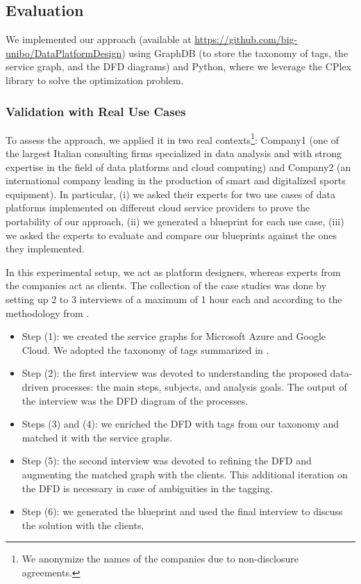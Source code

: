 \subsection{Evaluation}
\label{sec:pdd-eval}

We implemented our approach (available at \url{https://github.com/big-unibo/DataPlatformDesign}) using GraphDB (to store the taxonomy of tags, the service graph, and the DFD diagrams) and Python, where we leverage the CPlex library to solve the optimization problem.

\subsubsection{Validation with Real Use Cases}
\label{sec:pdd-val}

To assess the approach, we applied it in two real contexts\footnote{We anonymize the names of the companies due to non-disclosure agreements.}: Company1 (one of the largest Italian consulting firms specialized in data analysis and with strong expertise in the field of data platforms and cloud computing) and Company2 (an international company leading in the production of smart and digitalized sports equipment). In particular, (i) we asked their experts for two use cases of data platforms implemented on different cloud service providers to prove the portability of our approach, (ii) we generated a blueprint for each use case, (iii) we asked the experts to evaluate and compare our blueprints against the ones they implemented.

In this experimental setup, we act as platform designers, whereas experts from the companies act as clients. The collection of the case studies was done by setting up 2 to 3 interviews of a maximum of 1 hour each and according to the methodology from .

\begin{itemize}
    \item Step (1): we created the service graphs for Microsoft Azure and Google Cloud. We adopted the taxonomy of tags summarized in .
    \item Step (2): the first interview was devoted to understanding the proposed data-driven processes: the main steps, subjects, and analysis goals. The output of the interview was the DFD diagram of the processes.
    \item Steps (3) and (4): we enriched the DFD with tags from our taxonomy and matched it with the service graphs.
    \item Step (5): the second interview was devoted to refining the DFD and augmenting the matched graph with the clients. This additional iteration on the DFD is necessary in case of ambiguities in the tagging.
    \item Step (6): we generated the blueprint and used the final interview to discuss the solution with the clients.
\end{itemize}

